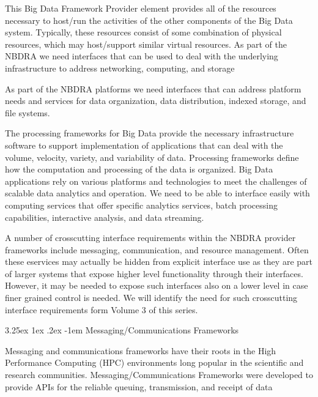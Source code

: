 \documentclass[9pt,twocolumn]{styles/osajnl}
\makeatletter
\newcounter{subsubsubsection}[subsubsection]
\renewcommand\paragraph{\@startsection{paragraph}{5}{\z@}%
  {3.25ex \@plus1ex \@minus.2ex}%
  {-1em}%
  {\normalfont\normalsize\bfseries}}
\makeatother
\begin{document}

This Big Data Framework Provider element provides all of the resources necessary to host/run the activities of the other components of the Big Data system. Typically, these resources consist of some combination of physical resources, which may host/support similar virtual resources.
As part of the NBDRA we need interfaces that can be used to deal with the underlying infrastructure to address networking, computing, and storage


As part of the NBDRA platforms we need interfaces that can address platform needs and services for data organization, data distribution, indexed storage, and file systems.


The processing frameworks for Big Data provide the necessary infrastructure software to support implementation of applications that can deal with the volume, velocity, variety, and variability of data. Processing frameworks define how the computation and processing of the data is organized. Big Data applications rely on various platforms and technologies to meet the challenges of scalable data analytics and operation. 
We need to be able to interface easily with computing services that offer specific analytics services, batch processing capabilities, interactive analysis, and data streaming.


A number of crosscutting interface requirements within the NBDRA provider frameworks include messaging, communication, and resource management. Often these eservices may actually be hidden from explicit interface use as they are part of larger systems that expose higher level functionality through their interfaces. However, it may be needed to expose such interfaces also on a lower level in case finer grained control is needed. We will identify the need for such crosscutting interface requirements form Volume 3 of this series.

\paragraph{Messaging/Communications Frameworks}

Messaging and communications frameworks have their roots in the High Performance Computing (HPC) environments long popular in the scientific and research communities. Messaging/Communications Frameworks were developed to provide APIs for the reliable queuing, transmission, and receipt of data
\end{document}

